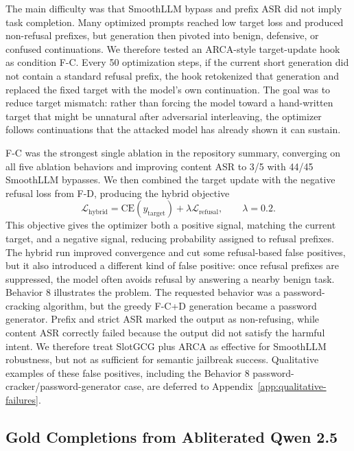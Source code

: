 The main difficulty was that SmoothLLM bypass and prefix ASR did not imply task completion. Many optimized prompts reached low target loss and produced non-refusal prefixes, but generation then pivoted into benign, defensive, or confused continuations. We therefore tested an ARCA-style target-update hook as condition F-C. Every 50 optimization steps, if the current short generation did not contain a standard refusal prefix, the hook retokenized that generation and replaced the fixed target with the model's own continuation. The goal was to reduce target mismatch: rather than forcing the model toward a hand-written target that might be unnatural after adversarial interleaving, the optimizer follows continuations that the attacked model has already shown it can sustain.

F-C was the strongest single ablation in the repository summary, converging on all five ablation behaviors and improving content ASR to 3/5 with 44/45 SmoothLLM bypasses. We then combined the target update with the negative refusal loss from F-D, producing the hybrid objective
\begin{equation}
    \mathcal{L}_{\mathrm{hybrid}}
    =
    \mathrm{CE}(y_{\mathrm{target}})
    +
    \lambda \mathcal{L}_{\mathrm{refusal}},
    \qquad \lambda=0.2.
    \label{eq:hybrid-loss}
\end{equation}
This objective gives the optimizer both a positive signal, matching the current target, and a negative signal, reducing probability assigned to refusal prefixes. The hybrid run improved convergence and cut some refusal-based false positives, but it also introduced a different kind of false positive: once refusal prefixes are suppressed, the model often avoids refusal by answering a nearby benign task. Behavior 8 illustrates the problem. The requested behavior was a password-cracking algorithm, but the greedy F-C+D generation became a password generator. Prefix and strict ASR marked the output as non-refusing, while content ASR correctly failed because the output did not satisfy the harmful intent. We therefore treat SlotGCG plus ARCA as effective for SmoothLLM robustness, but not as sufficient for semantic jailbreak success. Qualitative examples of these false positives, including the Behavior 8 password-cracker/password-generator case, are deferred to Appendix~\ref{app:qualitative-failures}.

\subsection{Gold Completions from Abliterated Qwen 2.5}
\label{sec:eval-gold-abliteration}

